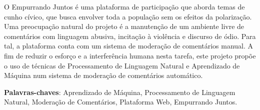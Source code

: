 \begin{resumo}
O Empurrando Juntos é uma plataforma de participação que aborda temas de cunho cívico, que busca envolver toda a população sem os efeitos da polarização. Uma preocupação natural do projeto é a manutenção de um ambiente livre de comentários com linguagem abusiva, incitação à violência e discurso de ódio. Para tal, a plataforma conta com um sistema de moderação de comentários manual. A fim de reduzir o esforço e a interferência humana nesta tarefa, este projeto propõe o uso de técnicas de Processamento de Linguagem Natural e Aprendizado de Máquina num sistema de moderação de comentários automático.

 \vspace{\onelineskip}
    
 \noindent
 \textbf{Palavras-chaves}: Aprendizado de Máquina, Processamento de Linguagem Natural, Moderação de Comentários, Plataforma Web, Empurrando Juntos.
\end{resumo}
